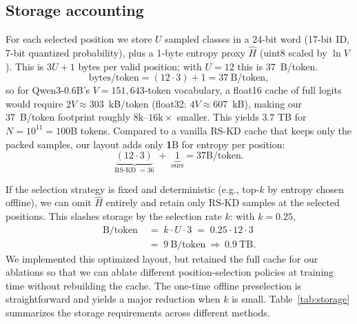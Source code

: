 \documentclass[11pt]{article}
\begin{document}
\subsection{Storage accounting}
For each selected position we store $U$ sampled classes in a 24-bit word (17-bit ID, 7-bit quantized probability), plus a 1-byte entropy proxy $\hat H$ (uint8 scaled by $\ln V$).
This is $3U+1$ bytes per valid position; with $U{=}12$ this is $37$~B/token.
\[
	\text{bytes/token} = (12 \cdot 3) + 1 = 37\ \text{B/token},
\]
so for Qwen3-0.6B's $V{=}151{,}643$-token vocabulary, a float16 cache of full logits would require $2V \approx 303$~kB/token (float32: $4V \approx 607$~kB), making our 37~B/token footprint roughly $8\text{k}$--$16\text{k}\times$ smaller.
This yields $3.7$ TB for $N{=}10^{11}{=}100$B tokens. Compared to a vanilla RS-KD cache that keeps only the packed samples, our layout adds only \textbf{1}B for entropy per position:
\[
	\underbrace{(12 \cdot 3)}_{\text{RS-KD }=36} \;+\; \underbrace{1}_{\text{ours}}
	= 37\text{B/token}.
\]

If the selection strategy is fixed and deterministic (e.g., top-$k$ by entropy chosen offline), we can omit $\hat H$ entirely and retain only RS-KD samples at the selected positions. This slashes storage by the selection rate $k$: with $k{=}0.25$,
\begin{align*}
	\text{B}/\text{token} \; & =\; k \cdot U \cdot 3
	\;=\; 0.25 \cdot 12 \cdot 3                                                              \\
	\;                       & =\; 9~\text{B}/\text{token} \ \Longrightarrow\ 0.9~\text{TB}.
\end{align*}
We implemented this optimized layout, but retained the full cache for our ablations so that we can ablate different position-selection policies at training time without rebuilding the cache. The one-time offline preselection is straightforward and yields a major reduction when $k$ is small.
Table~\ref{tab:storage} summarizes the storage requirements across different methods.
\end{document}
